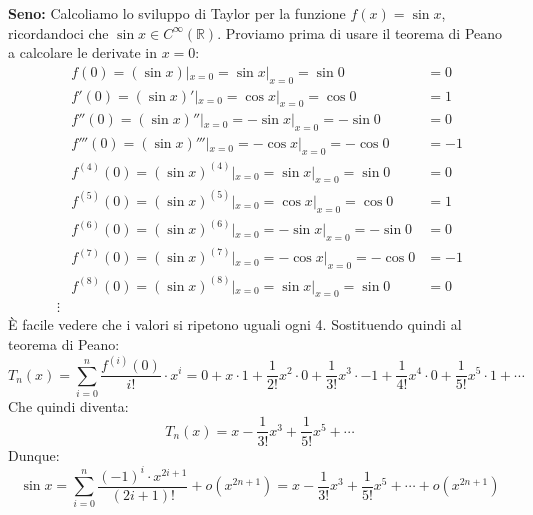 \textbf{Seno:} Calcoliamo lo sviluppo di Taylor per la funzione $f(x) = 
\sin{x}$, ricordandoci che $\sin{x} \in C^\infty (\mathbb{R})$. Proviamo prima 
di usare il teorema di Peano a calcolare le derivate in $x = 0$:
\begin{align*}
	&f(0) = (\sin{x}) |_{x = 0} = \sin{x} |_{x = 0} = \sin{0} &= 0\\[5pt]
	&f'(0) = (\sin{x})' |_{x = 0} = \cos{x} |_{x = 0} = \cos{0} &= 1\\[5pt]
	&f''(0) = (\sin{x})'' |_{x = 0} = -\sin{x} |_{x = 0} = -\sin{0} &= 0\\[5pt]
	&f'''(0) = (\sin{x})''' |_{x = 0} = -\cos{x} |_{x = 0} = 
    -\cos{0} &= -1\\[5pt]
	&f^{(4)}(0) = (\sin{x})^{(4)} |_{x = 0} = \sin{x} |_{x = 0} = 
    \sin{0} &= 0\\[5pt]
	&f^{(5)}(0) = (\sin{x})^{(5)} |_{x = 0} = \cos{x} |_{x = 0} = 
    \cos{0} &= 1\\[5pt]
	&f^{(6)}(0) = (\sin{x})^{(6)}|_{x = 0} = -\sin{x} |_{x = 0} = 
    -\sin{0} &= 0\\[5pt]
	&f^{(7)}(0) = (\sin{x})^{(7)} |_{x = 0} = -\cos{x} |_{x = 0} = 
    -\cos{0} &= -1\\[5pt]
	&f^{(8)}(0) = (\sin{x})^{(8)} |_{x = 0} = \sin{x} |_{x = 0} = 
    \sin{0} &= 0\\
	\vdots
\end{align*}
È facile vedere che i valori si ripetono uguali ogni 4. Sostituendo quindi al 
teorema di Peano:
\begin{equation*}
	T_n(x) = \sum \limits_{i = 0}^n \dfrac{f^{(i)}(0)}{i!} \cdot x^i = 0 + x 
    \cdot 1 + \dfrac{1}{2!}x^2 \cdot 0 + \dfrac{1}{3!}x^3 \cdot -1 + 
    \dfrac{1}{4!}x^4 \cdot 0 + \dfrac{1}{5!}x^5 \cdot 1 + \cdots 
\end{equation*}
Che quindi diventa:
\begin{equation*}
	T_n(x) = x - \dfrac{1}{3!}x^3 + \dfrac{1}{5!}x^5 + \cdots
\end{equation*}
Dunque:
\begin{equation*}
	\sin{x} = \sum \limits_{i = 0}^n \dfrac{(-1)^i \cdot x^{2i + 1}}{(2i+1)!} + 
    o(x^{2n +1})= x - \dfrac{1}{3!}x^3 + \dfrac{1}{5!}x^5 + \cdots + 
    o(x^{2n + 1})
\end{equation*}


